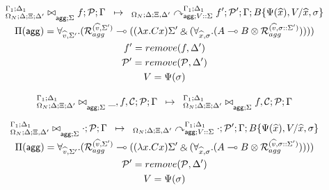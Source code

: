 
\[
\underset{
   \begin{gathered}
   \Pi(\m{agg}) = \forall_{\widehat{v}, \Sigma'}.
   (\defstwo{agg}{\widehat{v}}{\Sigma'} \lolli ((\lambda x. C x)\Sigma' \with (\forall_{\widehat{x}, \sigma}.
                                                (A \lolli B \otimes
                                                 \defstwo{agg}{\widehat{v}}{\sigma
                                                 ::\Sigma'})))) \\
   f' = remove(f, \Delta') \\
   \lstack{P'} = remove(\lstack{P}, \Delta') \\
   V = \Psi(\sigma)
   \end{gathered}
}
{
   \trans{
      \fixstatea{\Delta}{\Xi; \Delta'}{f; \lstack{P}}{\Gamma}{\Sigma}
   }
   {
      \derstatea{\Delta}{\Xi, \Delta'}{\Gamma_1}{\Delta_1}{V :: \Sigma}{f';
         \lstack{P'}}{B\{\Psi(\widehat{x}), V / \widehat{x}, \sigma \}}
   }
}
\]

\[
\trans{
   \fixstatea{\Delta}{\Xi; \Delta'}{\_, f, \lstack{C}; \lstack{P}}{\Gamma}{\Sigma}
}
{
   \fixstatea{\Delta}{\Xi; \Delta'}{f, \lstack{C}; \lstack{P}}{\Gamma}{\Sigma}
}
\]

\[
\underset{
   \begin{gathered}
   \Pi(\m{agg}) = \forall_{\widehat{v}, \Sigma'}.
   (\defstwo{agg}{\widehat{v}}{\Sigma'} \lolli ((\lambda x. C x)\Sigma' \with (\forall_{\widehat{x}, \sigma}.
                                                (A \lolli B \otimes
                                                 \defstwo{agg}{\widehat{v}}{\sigma
                                                 ::\Sigma'})))) \\
   \lstack{P'} = remove(\lstack{P}, \Delta') \\
   V = \Psi(\sigma)
   \end{gathered}
}
{
   \trans{
      \fixstatea{\Delta}{\Xi, \Delta'}{\cdot; \lstack{P}}{\Gamma}{\Sigma}
   }
   {
      \derstatea{\Delta}{\Xi, \Delta'}{\Gamma_1}{\Delta_1}{V :: \Sigma}{\cdot;
         \lstack{P}'}{B\{\Psi(\widehat{x}), V / \widehat{x}, \sigma \}}
   }
}
\]
